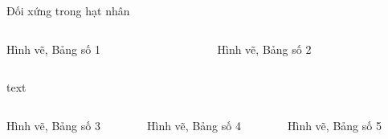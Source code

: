 \begin{frame}[label = doixung]{Đối xứng trong hạt nhân}

\begin{columns}[t]

  \begin{column}{0.4\textwidth}
	Hình vẽ, Bảng số 1
  \end{column}

  \begin{column}{0.4\textwidth}
	Hình vẽ, Bảng số 2
  \end{column}

\end{columns}

text

\begin{columns}[t]

  \begin{column}{0.3\textwidth}
	Hình vẽ, Bảng số 3
  \end{column}

  \begin{column}{0.3\textwidth}
	Hình vẽ, Bảng số 4
  \end{column}
	
  \begin{column}{0.3\textwidth}
	Hình vẽ, Bảng số 5
  \end{column}

\end{columns}

\end{frame}

